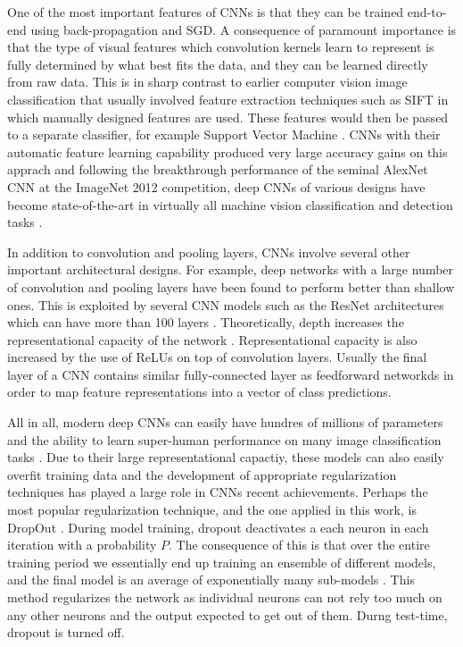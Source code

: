 \documentclass[12pt]{report}
\begin{document}
One of the most important features of CNNs is that they can be trained end-to-end using back-propagation and SGD. A consequence of paramount importance is that the type of visual features which convolution kernels learn to represent is fully determined by what best fits the data, and they can be learned directly from raw data. This is in sharp contrast to earlier computer vision image classification that usually involved feature extraction techniques \cite{Prince2012} such as SIFT \cite{Lowe1999} in which manually designed features are used. These features would then be passed to a separate classifier, for example Support Vector Machine \cite{Weston2010}. CNNs with their automatic feature learning capability produced very large accuracy gains on this apprach \cite{Razavian2014} and following the breakthrough performance of the seminal AlexNet CNN \cite{Krizhevsky2012} at the ImageNet 2012 competition, deep CNNs of various designs have become state-of-the-art in virtually all machine vision classification and detection tasks \cite{JurgenSchmidhuber2015}.

In addition to convolution and pooling layers, CNNs involve several other important architectural designs. For example, deep networks with a large number of convolution and pooling layers have been found to perform better \cite{Srivastava2015} than shallow ones. This is exploited by several CNN models such as the ResNet architectures which can have more than 100 layers \cite{He2015}. Theoretically, depth increases the representational capacity of the network \cite{Sun2015}. Representational capacity is also increased by the use of ReLUs on top of convolution layers. Usually the final layer of a CNN contains similar fully-connected layer as feedforward networkds in order to map feature representations into a vector of class predictions.

All in all, modern deep CNNs can easily have hundres of millions of parameters and the ability to learn super-human performance on many image classification tasks \cite{Lecun2015}. Due to their large representational capactiy, these models can also easily overfit training data and the development of appropriate regularization techniques has played a large role in CNNs recent achievements. Perhaps the most popular regularization technique, and the one applied in this work, is DropOut \cite{Srivastava2014}. During model training, dropout deactivates a each neuron in each iteration with a probability $P$. The consequence of this is that over the entire training period we essentially end up training an ensemble of different models, and the final model is an average of exponentially many sub-models \cite{Goodfellow2016}. This method regularizes the network as individual neurons can not rely too much on any other neurons and the output expected to get out of them. Durng test-time, dropout is turned off.
\end{document}
